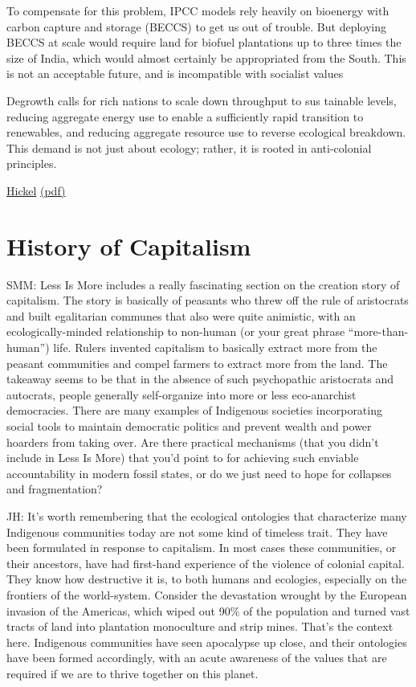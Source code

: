 \documentclass[
]{book}
\begin{document}
To compensate for this problem, IPCC models rely heavily on bioenergy
with carbon capture and storage (BECCS) to get us out of trouble. But
deploying BECCS at scale would require land for biofuel plantations up
to three times the size of India, which would almost certainly be
appropriated from the South. This is not an acceptable future, and is
incompatible with socialist values

Degrowth calls for rich nations to scale down throughput to sus­
tainable levels, reducing aggregate energy use to enable a sufficiently
rapid transition to renewables, and reducing aggregate resource use to
reverse ecological breakdown. This demand is not just about ecology;
rather, it is rooted in anti-colonial principles.

\href{https://www.sciencedirect.com/science/article/pii/S0962629821000640}{Hickel}
\href{pdf/Hickel_2021_Anti-colonial_degrowth.pdf}{(pdf)}

\hypertarget{history-of-capitalism}{%
\chapter{History of Capitalism}\label{history-of-capitalism}}

SMM: Less Is More includes a really fascinating section on the creation story of capitalism. The story is basically of peasants who threw off the rule of aristocrats and built egalitarian communes that also were quite animistic, with an ecologically-minded relationship to non-human (or your great phrase ``more-than-human'') life. Rulers invented capitalism to basically extract more from the peasant communities and compel farmers to extract more from the land. The takeaway seems to be that in the absence of such psychopathic aristocrats and autocrats, people generally self-organize into more or less eco-anarchist democracies. There are many examples of Indigenous societies incorporating social tools to maintain democratic politics and prevent wealth and power hoarders from taking over. Are there practical mechanisms (that you didn't include in Less Is More) that you'd point to for achieving such enviable accountability in modern fossil states, or do we just need to hope for collapses and fragmentation?

JH: It's worth remembering that the ecological ontologies that characterize many Indigenous communities today are not some kind of timeless trait. They have been formulated in response to capitalism. In most cases these communities, or their ancestors, have had first-hand experience of the violence of colonial capital. They know how destructive it is, to both humans and ecologies, especially on the frontiers of the world-system. Consider the devastation wrought by the European invasion of the Americas, which wiped out 90\% of the population and turned vast tracts of land into plantation monoculture and strip mines. That's the context here. Indigenous communities have seen apocalypse up close, and their ontologies have been formed accordingly, with an acute awareness of the values that are required if we are to thrive together on this planet.
\end{document}
